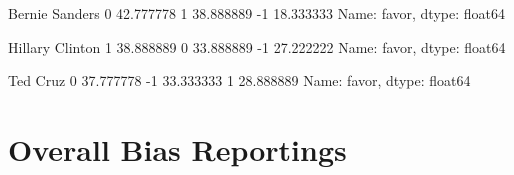  

Bernie Sanders
 0    42.777778
 1    38.888889
-1    18.333333
Name: favor, dtype: float64

Hillary Clinton
 1    38.888889
 0    33.888889
-1    27.222222
Name: favor, dtype: float64

Ted Cruz
 0    37.777778
-1    33.333333
 1    28.888889
Name: favor, dtype: float64


\section{Overall Bias Reportings}


%
 